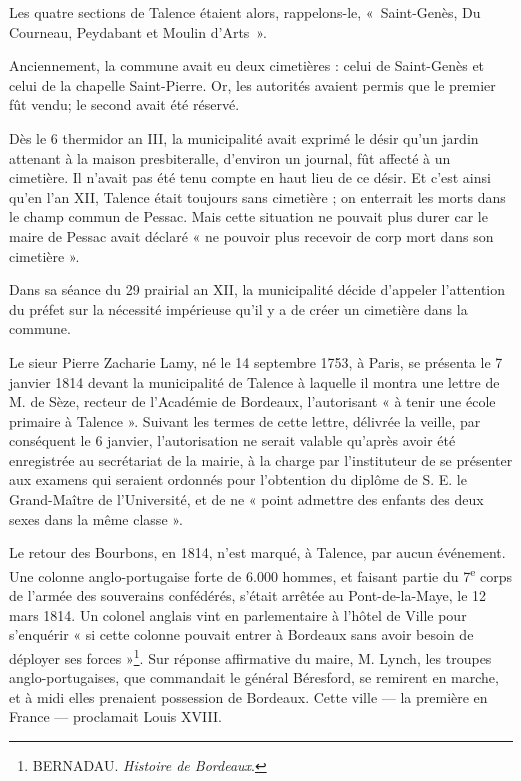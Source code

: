 \documentclass[a4paper,11pt]{book}
\begin{document}
Les quatre sections de Talence étaient alors, rappelons-le, «~Saint-Genès, Du Courneau, Peydabant et Moulin d'Arts~».

Anciennement, la commune avait eu deux cimetières : celui de Saint-Genès et celui de la chapelle Saint-Pierre. Or, les autorités avaient permis que le premier fût vendu; le second avait été réservé.

Dès le 6 thermidor an III, la municipalité avait exprimé le désir qu'un jardin attenant à la maison presbiteralle, d'environ un journal, fût affecté à un cimetière. Il n'avait pas été tenu compte en haut lieu de ce désir. Et c'est ainsi qu'en l'an XII, Talence était toujours sans cimetière ; on enterrait les morts dans le champ commun de Pessac. Mais cette situation ne pouvait plus durer car le maire de Pessac avait déclaré « ne pouvoir plus recevoir de corp mort dans son cimetière ».

Dans sa séance du 29 prairial an XII, la municipalité décide d'appeler l'attention du préfet sur la nécessité impérieuse qu'il y a de créer un cimetière dans la commune. 

Le sieur Pierre Zacharie Lamy, né le 14 septembre 1753, à Paris, se présenta le 7 janvier 1814 devant la municipalité de Talence à laquelle il montra une lettre de M. de
Sèze, recteur de l'Académie de Bordeaux, l'autorisant « à tenir une école primaire à Talence ». Suivant les termes de cette lettre, délivrée la veille, par conséquent le 6 janvier, l'autorisation ne serait valable qu'après avoir été enregistrée au secrétariat de la mairie, à la charge par l'instituteur de se présenter aux examens qui seraient ordonnés pour l'obtention du diplôme de S. E. le Grand-Maître de l'Université, et de ne « point admettre des enfants des deux sexes dans la même classe ».

Le retour des Bourbons, en 1814, n'est marqué, à Talence, par aucun événement. Une colonne anglo-portugaise forte de 6.000 hommes, et faisant partie du 7\textsuperscript{e} corps de l'armée des souverains confédérés, s'était arrêtée au Pont-de-la-Maye, le 12 mars 1814. Un colonel anglais vint en parlementaire à l'hôtel de Ville pour s'enquérir « si cette colonne pouvait entrer à Bordeaux sans avoir besoin
de déployer ses forces »\footnote{\textsc{BERNADAU}. \textit{Histoire de Bordeaux}.}. Sur réponse affirmative du maire, M. Lynch, les troupes anglo-portugaises, que commandait le général Béresford, se remirent en marche, et à midi elles prenaient possession de Bordeaux. Cette ville — la première en France — proclamait Louis XVIII.
\end{document}
